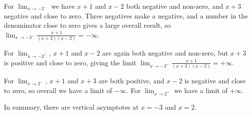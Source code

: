 \documentclass{article}
\newcommand{\ds}{\displaystyle}
\begin{document}
\begin{enumerate}
  For $\ds \lim_{x\to -3^-}$ we have $x+1$ and $x-2$ both negative and non-zero,
  and $x+3$ negative and close to zero.  Three negatives make a negative,
  and a number in the denominator close to zero gives a large overall
  result, so $\ds \lim_{x\to -3^-} \frac{x+1}{(x+3)(x-2)} = -\infty$.

  For $\ds \lim_{x\to -3^+}$, $x+1$ and $x-2$ are again both negative and
  non-zero, but $x+3$ is positive and close to zero, giving the limit
  $\ds \lim_{x\to -3^+} \frac{x+1}{(x+3)(x-2)} = +\infty$.

  For $\ds \lim_{x\to 2^-}$, $x+1$ and $x+3$ are both positive, and
  $x-2$ is negative and close to zero, so overall we have a limit
  of $-\infty$.  For $\ds \lim_{x\to 2^+}$ we have a limit of $+\infty$.

  In summary, there are vertical asymptotes at $x=-3$ and $x=2$.
\end{enumerate}
\end{document}
